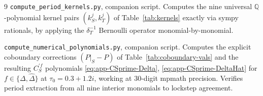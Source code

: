 \documentclass[11pt,letterpaper]{article}
\newcommand{\QQ}{\mathbb{Q}}
\begin{document}
\begin{thebibliography}{9}
\texttt{compute\_period\_kernels.py}, companion script.  Computes the nine
universal $\QQ$-polynomial kernel pairs $(k_S^j, k_T^j)$ of
Table~\ref{tab:kernels} exactly via sympy rationals, by applying the
$\delta_T^{-1}$ Bernoulli operator monomial-by-monomial.

\texttt{compute\_numerical\_polynomials.py}, companion script.  Computes the
explicit coboundary corrections $(P|_S - P)$ of Table~\ref{tab:coboundary-vals}
and the resulting $C^{\prime f}_S$ polynomials \eqref{eq:app-CSprime-Delta},
\eqref{eq:app-CSprime-DeltaHat} for $f \in \{\Delta, \widehat\Delta\}$ at
$\tau_0 = 0.3 + 1.2i$, working at $30$-digit mpmath precision.  Verifies
period extraction from all nine interior monomials to lockstep agreement.

\end{thebibliography}
\end{document}
